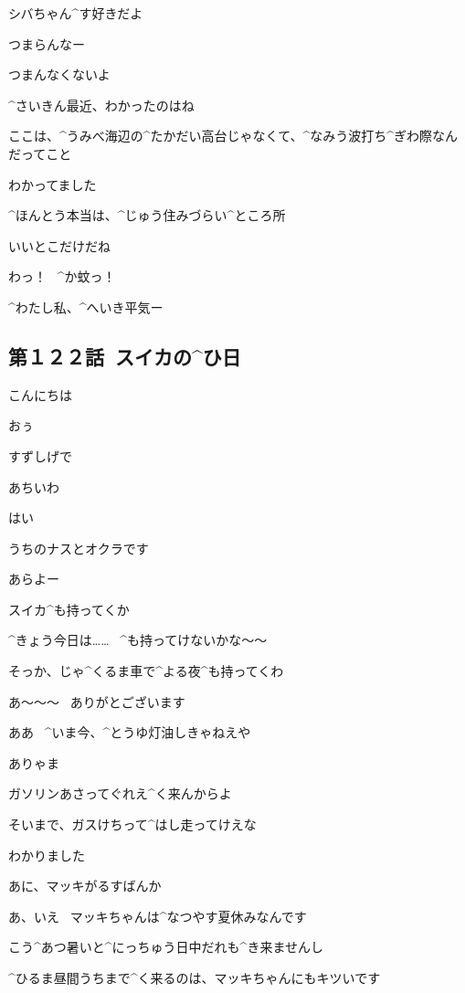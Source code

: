 \page[15]
\Kokone シバちゃん^{す}{好}きだよ

\Shiba つまらんなー

\Kokone つまんなくないよ

\page[17]
\Alpha ^{さいきん}{最近}、わかったのはね

\Alpha ここは、^{うみべ}{海辺}の^{たかだい}{高台}じゃなくて、^{なみう}{波打}ち^{ぎわ}{際}なんだってこと

\Makki わかってました

\Alpha ^{ほんとう}{本当}は、^{じゅう}{住}みづらい^{ところ}{所}

\Makki いいとこだけだね

\page[18]
\Makki わっ！
\ ^{か}{蚊}っ！

\Alpha ^{わたし}{私}、^{へいき}{平気}ー


\subsection{第１２２話\ スイカの^{ひ}{日}}

\page[21]
\Alpha こんにちは

\Ojisan おぅ

\Alpha すずしげで

\Ojisan あちいわ

\Alpha はい

\Alpha うちのナスとオクラです

\Ojisan あらよー

\page[22]
\Ojisan スイカ^{も}{持}ってくか

\Alpha ^{きょう}{今日}は……
\ ^{も}{持}ってけないかな〜〜

\Ojisan そっか、じゃ^{くるま}{車}で^{よる}{夜}^{も}{持}ってくわ

\Alpha あ〜〜〜
\ ありがとございます

\Ojisan ああ
\ ^{いま}{今}、^{とうゆ}{灯油}しきゃねえや

\Alpha ありゃま

\Ojisan ガソリンあさってぐれえ^{く}{来}んからよ

\Ojisan そいまで、ガスけちって^{はし}{走}ってけえな

\Alpha わかりました

\page[24]
\Ojisan あに、マッキがるすばんか

\Alpha あ、いえ
\ マッキちゃんは^{なつやす}{夏休}みなんです

\Alpha こう^{あつ}{暑}いと^{にっちゅう}{日中}だれも^{き}{来}ませんし

\Alpha ^{ひるま}{昼間}うちまで^{く}{来}るのは、マッキちゃんにもキツいです

